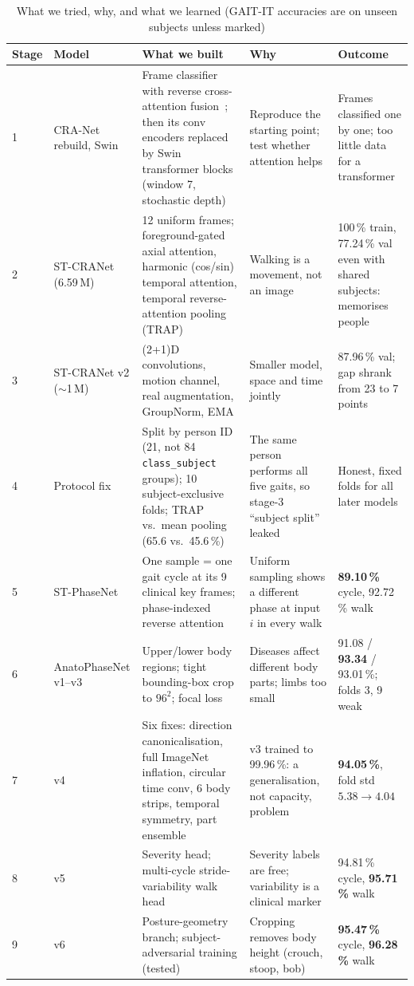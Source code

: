 \documentclass[conference]{IEEEtran}
\begin{document}
\begin{table}[!t]
\centering
\caption{What we tried, why, and what we learned (GAIT-IT accuracies are on unseen subjects unless marked)}
\label{tab:journey}
\footnotesize
\setlength{\tabcolsep}{3pt}
\begin{tabular}{@{}p{0.6cm}p{2.5cm}p{6.2cm}p{4.1cm}p{3.5cm}@{}}
\toprule
Stage & Model & What we built & Why & Outcome \\
\midrule
1 & CRA-Net rebuild, Swin & Frame classifier with reverse cross-attention fusion~\cite{bodepu_cranet}; then its conv encoders replaced by Swin transformer blocks~\cite{liu2021swin} (window 7, stochastic depth) & Reproduce the starting point; test whether attention helps & Frames classified one by one; too little data for a transformer \\
2 & ST-CRANet (6.59\,M) & 12 uniform frames; foreground-gated axial attention, harmonic (cos/sin) temporal attention, temporal reverse-attention pooling (TRAP) & Walking is a movement, not an image & 100\,\% train, 77.24\,\% val even with shared subjects: memorises people \\
3 & ST-CRANet v2 ($\sim$1\,M) & (2+1)D convolutions, motion channel, real augmentation, GroupNorm, EMA & Smaller model, space and time jointly & 87.96\,\% val; gap shrank from 23 to 7 points \\
4 & Protocol fix & Split by person ID (21, not 84 \texttt{class\_subject} groups); 10 subject-exclusive folds; TRAP vs.\ mean pooling (65.6 vs.\ 45.6\,\%) & The same person performs all five gaits, so stage-3 ``subject split'' leaked & Honest, fixed folds for all later models \\
5 & ST-PhaseNet & One sample = one gait cycle at its 9 clinical key frames; phase-indexed reverse attention & Uniform sampling shows a different phase at input $i$ in every walk & \textbf{89.10\,\%} cycle, 92.72\,\% walk \\
6 & AnatoPhaseNet v1--v3 & Upper/lower body regions; tight bounding-box crop to $96^2$; focal loss & Diseases affect different body parts; limbs too small & 91.08 / \textbf{93.34} / 93.01\,\%; folds 3, 9 weak \\
7 & v4 & Six fixes: direction canonicalisation, full ImageNet inflation, circular time conv, 6 body strips, temporal symmetry, part ensemble & v3 trained to 99.96\,\%: a generalisation, not capacity, problem & \textbf{94.05\,\%}, fold std $5.38\rightarrow4.04$ \\
8 & v5 & Severity head; multi-cycle stride-variability walk head & Severity labels are free; variability is a clinical marker & 94.81\,\% cycle, \textbf{95.71\,\%} walk \\
9 & v6 & Posture-geometry branch; subject-adversarial training (tested) & Cropping removes body height (crouch, stoop, bob) & \textbf{95.47\,\%} cycle, \textbf{96.28\,\%} walk \\
\bottomrule
\end{tabular}
\end{table}
\end{document}

